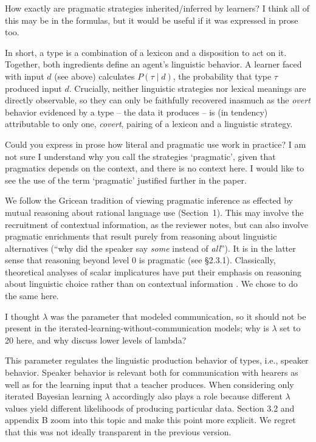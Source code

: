 \documentclass[12pt,a4paper]{article}
\begin{document}
\vspace{.5cm}
\begin{mdframed}[backgroundcolor=gray!25,linecolor=gray!25]
How exactly are pragmatic strategies inherited/inferred by learners?    I think all of this may be in the formulas, but it would be useful if it was expressed in prose too.
\end{mdframed}
In short, a type is a combination of a lexicon and a disposition to act on it. Together, both ingredients define an agent's linguistic behavior. A learner faced with input $d$ (see above) calculates $P(\tau \mid d)$, the probability that type $\tau$ produced input $d$. Crucially, neither linguistic strategies nor lexical meanings are directly observable, so they can only be faithfully recovered inasmuch as the {\em overt} behavior evidenced by a type -- the data it produces -- is (in tendency) attributable to only one, {\em covert}, pairing of a lexicon and a linguistic strategy.

\vspace{.5cm}
\begin{mdframed}[backgroundcolor=gray!25,linecolor=gray!25]
Could you express in prose how literal and pragmatic use work in practice? I am not sure I understand why you call the strategies `pragmatic', given that pragmatics depends on the context, and there is no context here. I would like to see the use of the term `pragmatic' justified further in the paper.
\end{mdframed}
We follow the Gricean tradition of viewing pragmatic inference as effected by mutual reasoning about rational language use (Section~1). This may involve the recruitment of contextual information, as the reviewer notes, but can also involve pragmatic enrichments that result purely from reasoning about linguistic alternatives (``why did the speaker say {\em some} instead of {\em all}''). It is in the latter sense that reasoning beyond level $0$ is pragmatic (see \S2.3.1). Classically, theoretical analyses of scalar implicatures have put their emphasis on reasoning about linguistic choice rather than on contextual information \citep[e.g.,][]{horn:1972,gazdar:1979, franke:2009, GoodmanStuhlmuller2013:Knowledge-and-I}. We chose to do the same here.

\vspace{.5cm}
\begin{mdframed}[backgroundcolor=gray!25,linecolor=gray!25]
I thought $\lambda$ was the parameter that modeled communication, so it should not be present in the iterated-learning-without-communication models; why is $\lambda$ set to 20 here, and why discuss lower levels of lambda? 
\end{mdframed}
This parameter regulates the linguistic production behavior of types, i.e., speaker
behavior. Speaker behavior is relevant both for communication with hearers as well as for the
learning input that a teacher produces. When considering only iterated Bayesian learning
$\lambda$ accordingly also plays a role because different $\lambda$ values yield different
likelihoods of producing particular data. Section 3.2 and appendix B zoom into this topic and
make this point more explicit. We regret that this was not ideally transparent in the previous
version.
\end{document}
